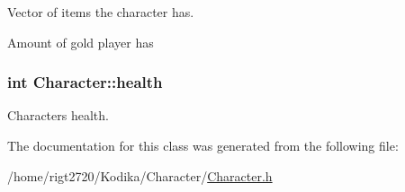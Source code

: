 Vector of items the character has. 

Amount of gold player has \hypertarget{classCharacter_a69c649b8febd22729e6edafb27e69aeb}{
\subsubsection[{health}]{\setlength{\rightskip}{0pt plus 5cm}int Character\-::health\hspace{0.3cm}{\ttfamily [protected]}}}\label{classCharacter_a69c649b8febd22729e6edafb27e69aeb}


Characters health. 



The documentation for this class was generated from the following file\-:\begin{DoxyCompactItemize}
\item 
/home/rigt2720/\-Kodika/\-Character/\hyperlink{Character_8h}{Character.\-h}\end{DoxyCompactItemize}
